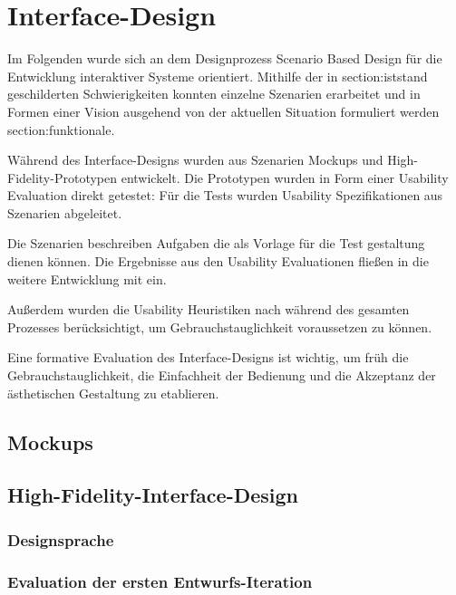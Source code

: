 \chapter{Interface-Design}
\label{chapter-design}
Im Folgenden wurde sich an dem Designprozess Scenario Based Design für die Entwicklung interaktiver
Systeme orientiert. Mithilfe der in \refname{section:iststand} geschilderten Schwierigkeiten konnten
einzelne Szenarien erarbeitet und in Formen einer Vision ausgehend von der aktuellen Situation
formuliert werden \refname{section:funktionale}.

Während des Interface-Designs wurden aus Szenarien Mockups und High-Fidelity-Prototypen entwickelt.
Die Prototypen wurden in Form einer Usability Evaluation direkt getestet: Für die Tests wurden
Usability Spezifikationen aus Szenarien abgeleitet.

Die Szenarien beschreiben Aufgaben die als Vorlage für die Test gestaltung dienen können. Die
Ergebnisse aus den Usability Evaluationen fließen in die weitere Entwicklung mit ein.

Außerdem wurden die Usability Heuristiken nach  während des gesamten
Prozesses berücksichtigt, um Gebrauchstauglichkeit voraussetzen zu können.

Eine formative Evaluation des Interface-Designs ist wichtig, um früh die Gebrauchstauglichkeit,
die Einfachheit der Bedienung und die Akzeptanz der ästhetischen Gestaltung zu etablieren.



\section{Mockups}

\section{High-Fidelity-Interface-Design}
\subsection{Designsprache}

\subsection{Evaluation der ersten Entwurfs-Iteration}


